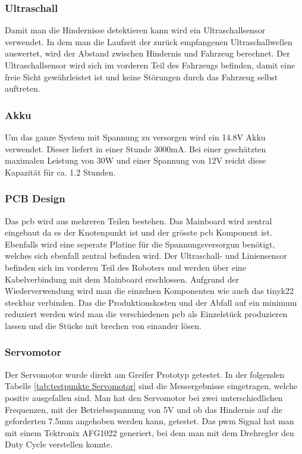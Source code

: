 \subsubsection{Ultraschall}

Damit man die Hindernisse detektieren kann wird ein Ultraschallsensor verwendet. In dem man die Laufzeit der zurück empfangenen Ultraschallwellen auswertet, wird der Abstand zwischen Hindernis und Fahrzeug berechnet. Der Ultraschallsensor wird sich im vorderen Teil des Fahrzeugs befinden, damit eine freie Sicht gewährleistet ist und keine Störungen durch das Fahrzeug selbst auftreten.

\subsubsection{Akku}

Um das ganze System mit Spannung zu versorgen wird ein 14.8V Akku verwendet. Dieser liefert in einer Stunde 3000mA. Bei einer geschätzten maximalen Leistung von 30W und einer Spannung von 12V reicht diese Kapazität für ca. 1.2 Stunden. 

\subsubsection{PCB Design}

Das \acrshort{pcb} wird aus mehreren Teilen bestehen. Das Mainboard wird zentral eingebaut da es der Knotenpunkt ist und der grösste \acrshort{pcb} Komponent ist. Ebenfalls wird eine seperate Platine für die Spannungsversorgun benötigt, welches sich ebenfall zentral befinden wird. Der Ultraschall- und Liniensensor befinden sich im vorderen Teil des Roboters und werden über eine Kabelverbindung mit dem Mainboard erschlossen. Aufgrund der Wiederverwendung wird man die einzelnen Komponenten wie auch das \acrshort{tinyk22} steckbar verbinden. Das die Produktionskosten und der Abfall auf ein minimum reduziert werden wird man die verschiedenen \acrshort{pcb} als Einzelstück produzieren lassen und die Stücke mit brechen von einander lösen.

\subsubsection{Servomotor}

Der Servomotor wurde direkt am Greifer Prototyp getestet. In der folgenden Tabelle \ref{tab:testpunkte Servomotor} sind die Messergebnisse eingetragen, welche positiv ausgefallen sind. Man hat den Servomotor bei zwei unterschiedlichen Frequenzen, mit der Betriebsspannung von 5V und ob das Hindernis auf die geforderten 7.5mm angehoben werden kann, getestet. Das \acrshort{pwm} Signal hat man mit einem Tektronix AFG1022 generiert, bei dem man mit dem Drehregler den Duty Cycle verstellen konnte.

